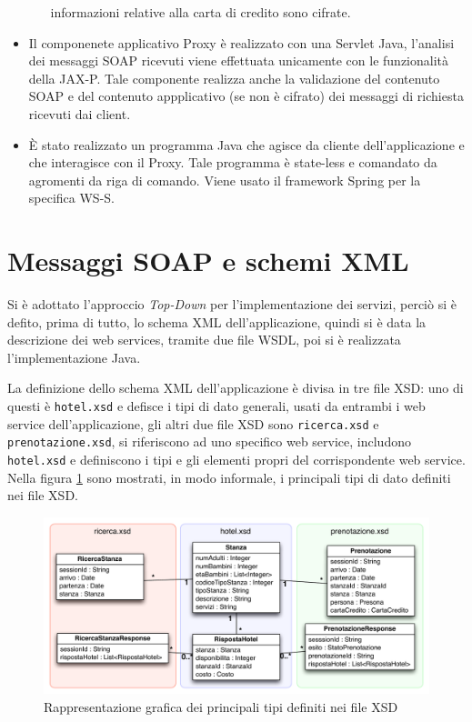 \documentclass[a4paper]{article}
\begin{document}
\begin{itemize}
\begin{itemize}
    informazioni relative alla carta di credito sono cifrate.
  \end{itemize}
\item Il componenete applicativo Proxy \`e realizzato con una Servlet
  Java, l'analisi dei messaggi SOAP ricevuti viene effettuata
  unicamente con le funzionalit\`a della JAX-P. Tale componente
  realizza anche la validazione del contenuto SOAP e del contenuto
  appplicativo (se non \`e cifrato) dei messaggi di richiesta ricevuti
  dai client.
\item \`E stato realizzato un programma Java che agisce da cliente
  dell'applicazione e che interagisce con il Proxy. Tale programma \`e
  state-less e comandato da agromenti da riga di comando. Viene usato
  il framework Spring per la specifica WS-S.
\end{itemize}


\section{Messaggi SOAP e schemi XML}
\label{sec:xml}
Si \`e adottato l'approccio \emph{Top-Down} per l'implementazione dei
servizi, perci\`o si \`e defito, prima di tutto, lo schema XML
dell'applicazione, quindi si \`e data la descrizione dei web services,
tramite due file WSDL, poi si \`e realizzata l'implementazione Java.

La definizione dello schema XML dell'applicazione \`e divisa in tre
file XSD: uno di questi \`e \verb+hotel.xsd+ e defisce i tipi di dato
generali, usati da entrambi i web service dell'applicazione, gli altri
due file XSD sono \verb+ricerca.xsd+ e \verb+prenotazione.xsd+, si
riferiscono ad uno specifico web service, includono \verb+hotel.xsd+ e
definiscono i tipi e gli elementi propri del corrispondente web
service. Nella figura \ref{tipiXSD-figura} sono mostrati, in modo
informale, i principali tipi di dato definiti nei file XSD.

\begin{figure}[h]
  \includegraphics[scale = 0.58]{classi.pdf}
  \caption[asfd]{Rappresentazione grafica dei principali tipi definiti nei
    file XSD}
  \label{tipiXSD-figura}
\end{figure}
\end{document}
